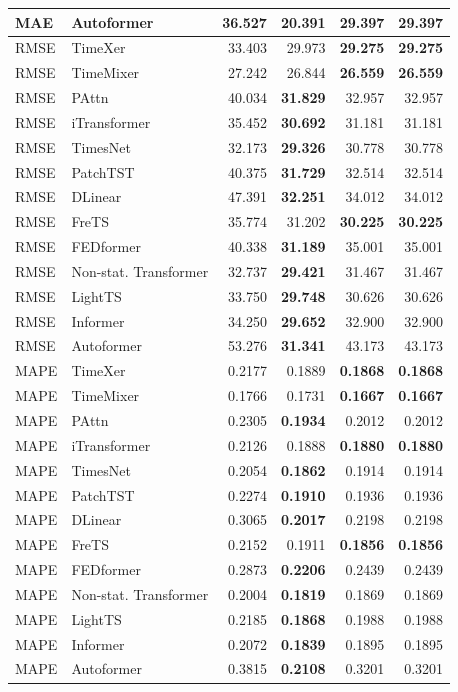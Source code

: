 \begin{longtable}{llrrrr}
MAE & Autoformer & 36.527 & \textbf{20.391} & 29.397 & 29.397 \\
\midrule
RMSE & TimeXer & 33.403 & 29.973 & \textbf{29.275} & \textbf{29.275} \\
RMSE & TimeMixer & 27.242 & 26.844 & \textbf{26.559} & \textbf{26.559} \\
RMSE & PAttn & 40.034 & \textbf{31.829} & 32.957 & 32.957 \\
RMSE & iTransformer & 35.452 & \textbf{30.692} & 31.181 & 31.181 \\
RMSE & TimesNet & 32.173 & \textbf{29.326} & 30.778 & 30.778 \\
RMSE & PatchTST & 40.375 & \textbf{31.729} & 32.514 & 32.514 \\
RMSE & DLinear & 47.391 & \textbf{32.251} & 34.012 & 34.012 \\
RMSE & FreTS & 35.774 & 31.202 & \textbf{30.225} & \textbf{30.225} \\
RMSE & FEDformer & 40.338 & \textbf{31.189} & 35.001 & 35.001 \\
RMSE & Non-stat. Transformer & 32.737 & \textbf{29.421} & 31.467 & 31.467 \\
RMSE & LightTS & 33.750 & \textbf{29.748} & 30.626 & 30.626 \\
RMSE & Informer & 34.250 & \textbf{29.652} & 32.900 & 32.900 \\
RMSE & Autoformer & 53.276 & \textbf{31.341} & 43.173 & 43.173 \\
\midrule
MAPE & TimeXer & 0.2177 & 0.1889 & \textbf{0.1868} & \textbf{0.1868} \\
MAPE & TimeMixer & 0.1766 & 0.1731 & \textbf{0.1667} & \textbf{0.1667} \\
MAPE & PAttn & 0.2305 & \textbf{0.1934} & 0.2012 & 0.2012 \\
MAPE & iTransformer & 0.2126 & 0.1888 & \textbf{0.1880} & \textbf{0.1880} \\
MAPE & TimesNet & 0.2054 & \textbf{0.1862} & 0.1914 & 0.1914 \\
MAPE & PatchTST & 0.2274 & \textbf{0.1910} & 0.1936 & 0.1936 \\
MAPE & DLinear & 0.3065 & \textbf{0.2017} & 0.2198 & 0.2198 \\
MAPE & FreTS & 0.2152 & 0.1911 & \textbf{0.1856} & \textbf{0.1856} \\
MAPE & FEDformer & 0.2873 & \textbf{0.2206} & 0.2439 & 0.2439 \\
MAPE & Non-stat. Transformer & 0.2004 & \textbf{0.1819} & 0.1869 & 0.1869 \\
MAPE & LightTS & 0.2185 & \textbf{0.1868} & 0.1988 & 0.1988 \\
MAPE & Informer & 0.2072 & \textbf{0.1839} & 0.1895 & 0.1895 \\
MAPE & Autoformer & 0.3815 & \textbf{0.2108} & 0.3201 & 0.3201 \\
\end{longtable}
\endgroup

